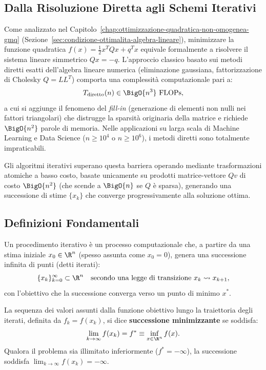 \subsection{Dalla Risoluzione Diretta agli Schemi Iterativi}
Come analizzato nel Capitolo~\ref{chap:ottimizzazione-quadratica-non-omogenea-gmq} (Sezione~\ref{sec:condizione-ottimalita-algebra-lineare}), minimizzare la funzione quadratica $f(x) = \frac{1}{2} x^T Q x + q^T x$ equivale formalmente a risolvere il sistema lineare simmetrico $Q x = -q$. L'approccio classico basato sui metodi diretti esatti dell'algebra lineare numerica (eliminazione gaussiana, fattorizzazione di Cholesky $Q = L L^T$) comporta una complessit\`a computazionale pari a:
\begin{equation}
    T_{\text{diretto}}(n) \in \BigO{n^3} \text{ FLOPs},
\end{equation}
a cui si aggiunge il fenomeno del \textit{fill-in} (generazione di elementi non nulli nei fattori triangolari) che distrugge la sparsit\`a originaria della matrice e richiede $\BigO{n^2}$ parole di memoria. Nelle applicazioni su larga scala di Machine Learning e Data Science ($n \ge 10^4$ o $n \ge 10^6$), i metodi diretti sono totalmente impraticabili.

Gli algoritmi iterativi superano questa barriera operando mediante trasformazioni atomiche a basso costo, basate unicamente su prodotti matrice-vettore $Q v$ di costo $\BigO{n^2}$ (che scende a $\BigO{n}$ se $Q$ \`e sparsa), generando una successione di stime $\{x_k\}$ che converge progressivamente alla soluzione ottima.

\subsection{Definizioni Fondamentali}

\begin{definition}
Un procedimento iterativo \`e un processo computazionale che, a partire da una stima iniziale $x_0 \in \R^n$ (spesso assunta come $x_0 = 0$), genera una successione infinita di punti (detti iterati):
\begin{equation}
    \{x_k\}_{k=0}^\infty \subset \R^n \quad \text{secondo una legge di transizione } x_k \rightsquigarrow x_{k+1},
\end{equation}
con l'obiettivo che la successione converga verso un punto di minimo $x^*$.
\end{definition}

\begin{definition}
La sequenza dei valori assunti dalla funzione obiettivo lungo la traiettoria degli iterati, definita da $f_k = f(x_k)$, si dice \textbf{successione minimizzante} se soddisfa:
\begin{equation}
    \lim_{k \to \infty} f(x_k) = f^* \equiv \inf_{x \in \R^n} f(x).
\end{equation}
Qualora il problema sia illimitato inferiormente ($f^* = -\infty$), la successione soddisfa $\lim_{k \to \infty} f(x_k) = -\infty$.
\end{definition}

